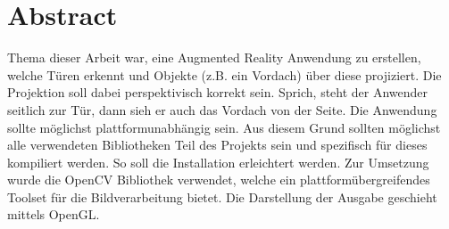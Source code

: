 \chapter*{Abstract}
Thema dieser Arbeit war, eine Augmented Reality Anwendung zu erstellen, welche Türen erkennt und Objekte (z.B. ein Vordach) über diese projiziert. Die Projektion soll dabei perspektivisch korrekt sein. Sprich, steht der Anwender seitlich zur Tür, dann sieh er auch das Vordach von der Seite. Die Anwendung sollte möglichst plattformunabhängig sein. Aus diesem Grund sollten möglichst alle verwendeten Bibliotheken Teil des Projekts sein und spezifisch für dieses kompiliert werden. So soll die Installation erleichtert werden. Zur Umsetzung wurde die OpenCV Bibliothek verwendet, welche ein plattformübergreifendes Toolset für die Bildverarbeitung bietet. Die Darstellung der Ausgabe geschieht mittels OpenGL.